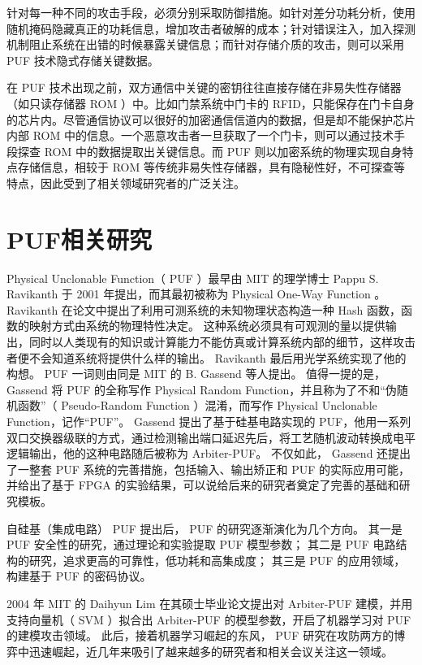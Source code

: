 针对每一种不同的攻击手段，必须分别采取防御措施。如针对差分功耗分析，使用随机掩码隐藏真正的功耗信息，增加攻击者破解的成本\supercite{rivain2010provably}；针对错误注入，加入探测机制阻止系统在出错的时候暴露关键信息\supercite{karaklajic2013hardware}；而针对存储介质的攻击，则可以采用 PUF 技术隐式存储关键数据。

在 PUF 技术出现之前，双方通信中关键的密钥往往直接存储在非易失性存储器（如只读存储器 ROM ）中。比如门禁系统中门卡的 RFID，只能保存在门卡自身的芯片内。尽管通信协议可以很好的加密通信信道内的数据，但是却不能保护芯片内部 ROM 中的信息。一个恶意攻击者一旦获取了一个门卡，则可以通过技术手段探查 ROM 中的数据提取出关键信息。而 PUF 则以加密系统的物理实现自身特点存储信息，相较于 ROM 等传统非易失性存储器，具有隐秘性好，不可探查等特点，因此受到了相关领域研究者的广泛关注。

\section{PUF相关研究}\label{sec:PUF-research}
Physical Unclonable Function（ PUF ）最早由 MIT 的理学博士 Pappu S. Ravikanth 于 2001 年提出\supercite{pappu2002physical}，而其最初被称为 Physical One-Way Function 。
Ravikanth 在论文中提出了利用可测系统的未知物理状态构造一种 Hash 函数，函数的映射方式由系统的物理特性决定。
这种系统必须具有可观测的量以提供输出，同时以人类现有的知识或计算能力不能仿真或计算系统内部的细节，这样攻击者便不会知道系统将提供什么样的输出。
Ravikanth 最后用光学系统实现了他的构想。
PUF 一词则由同是 MIT 的 B. Gassend 等人提出\supercite{gassend2002silicon}。
值得一提的是， Gassend 将 PUF 的全称写作 Physical Random Function，并且称为了不和``伪随机函数''（ Pseudo-Random Function ）混淆，而写作 Physical Unclonable Function，记作``PUF''。
Gassend 提出了基于硅基电路实现的 PUF，他用一系列双口交换器级联的方式，通过检测输出端口延迟先后，将工艺随机波动转换成电平逻辑输出，他的这种电路随后被称为 Arbiter-PUF。
不仅如此， Gassend 还提出了一整套 PUF 系统的完善措施，包括输入、输出矫正和 PUF 的实际应用可能，并给出了基于 FPGA 的实验结果，可以说给后来的研究者奠定了完善的基础和研究模板。

自硅基（集成电路） PUF 提出后， PUF 的研究逐渐演化为几个方向。
其一是 PUF 安全性的研究，通过理论和实验提取 PUF 模型参数；
其二是 PUF 电路结构的研究，追求更高的可靠性，低功耗和高集成度；
其三是 PUF 的应用领域，构建基于 PUF 的密码协议。

2004 年 MIT 的 Daihyun Lim 在其硕士毕业论文\supercite{lim2005extracting}提出对 Arbiter-PUF 建模，并用支持向量机（ SVM ）拟合出 Arbiter-PUF 的模型参数，开启了机器学习对 PUF 的建模攻击领域。
此后，接着机器学习崛起的东风， PUF 研究在攻防两方的博弈中迅速崛起，近几年来吸引了越来越多的研究者和相关会议关注这一领域。

